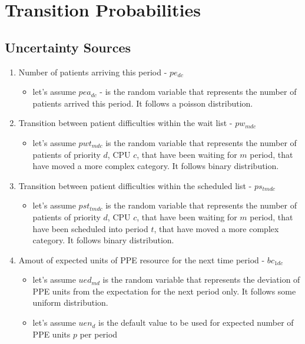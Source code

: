 \documentclass{article}
\begin{document}
\section{Transition Probabilities}

\subsection{Uncertainty Sources}
\begin{enumerate}
    	
	\item Number of patients arriving this period - $pe_{dc}$
		\begin{itemize}
			\item let's assume $pea_{dc}$ - is the random variable that represents the number of patients arrived this period. It follows a poisson distribution.
		\end{itemize}
	
	\item Transition between patient difficulties within the wait list - $pw_{mdc}$
		\begin{itemize}
			\item let's assume $pwt_{mdc}$ is the random variable that represents the number of patients of priority $d$, CPU $c$, that have been waiting for $m$ period, that have moved a more complex category. It follows binary distribution.
		\end{itemize}
		
	\item Transition between patient difficulties within the scheduled list - $ps_{tmdc}$
		\begin{itemize}
			\item let's assume $pst_{tmdc}$ is the random variable that represents the number of patients of priority $d$, CPU $c$, that have been waiting for $m$ period, that have been scheduled into period $t$, that have moved a more complex category. It follows binary distribution.
		\end{itemize}

	\item Amout of expected units of PPE resource for the next time period - $bc_{1dc}$
		\begin{itemize}
			\item let's assume $ued_{md}$ is the random variable that represents the deviation of PPE units from the expectation for the next period only. It follows some uniform distribution.
			\item let's assume $uen_{d}$ is the default value to be used for expected number of PPE units $p$ per period
		\end{itemize}
\end{enumerate}
\end{document}
